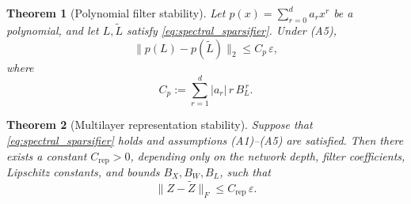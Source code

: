 \documentclass[10pt,a4paper]{amsart}
\newtheorem{theorem}{Theorem}
\begin{document}
\begin{theorem}[Polynomial filter stability]
\label{thm:poly_stability}
Let $p(x)=\sum_{r=0}^{d} a_r x^r$ be a polynomial, and let $L,\widetilde L$ satisfy \eqref{eq:spectral_sparsifier}. Under (A5),
\begin{equation}
\|p(L)-p(\widetilde L)\|_2 \le C_p\,\varepsilon,
\label{eq:poly_stability}
\end{equation}
where
\[
C_p := \sum_{r=1}^{d} |a_r|\, r\, B_L^{\,r}.
\]
\end{theorem}

\begin{theorem}[Multilayer representation stability]
\label{thm:multilayer_stability}
Suppose that \eqref{eq:spectral_sparsifier} holds and assumptions (A1)--(A5) are satisfied. Then there exists a constant $C_{\mathrm{rep}}>0$, depending only on the network depth, filter coefficients, Lipschitz constants, and bounds $B_X,B_W,B_L$, such that
\begin{equation}
\|Z-\widetilde Z\|_F \le C_{\mathrm{rep}}\,\varepsilon.
\label{eq:multilayer_stability}
\end{equation}
\end{theorem}
\end{document}
